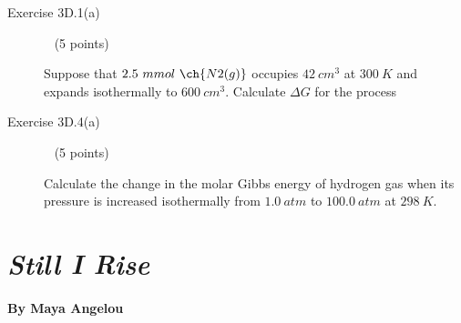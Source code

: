\documentclass[12pt, openany, letterpaper]{memoir}
\begin{document}
\begin{description}
	\item [Exercise 3D.1(a)] ~ (5 points)
	
	Suppose that $2.5~mmol~\ch{N2(g)}$ occupies $42~cm^3$ at $300~K$ and expands isothermally to $600~cm^3$. Calculate $\Delta G$ for the process
	
	\vspace{12em}
	\item [Exercise 3D.4(a)] ~ (5 points)
	
	Calculate the change in the molar Gibbs energy of hydrogen gas when its pressure is increased isothermally from $1.0~atm$ to $100.0~atm$ at $298~K$.
	

\end{description}

\newpage
\pagestyle{empty}
\addtocounter{page}{-1}
\section*{\emph{Still I Rise}}
\paragraph{By Maya Angelou}~
\end{document}
